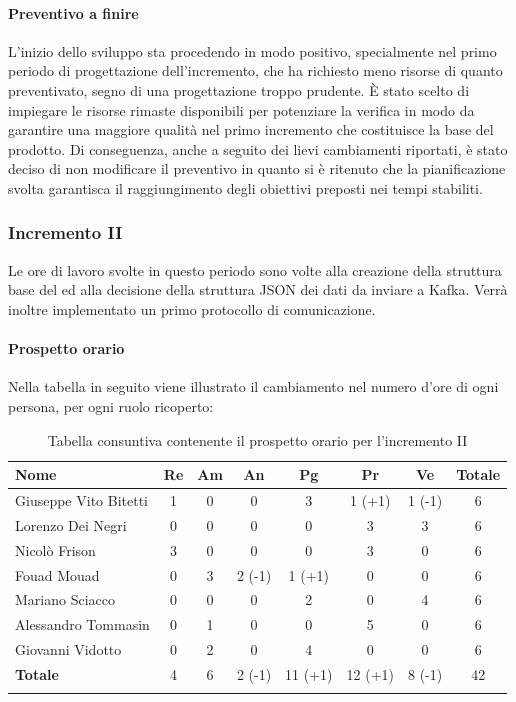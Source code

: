 		\paragraph{Preventivo a finire}
			L'inizio dello sviluppo sta procedendo in modo positivo, specialmente nel primo periodo di progettazione dell'incremento, che ha richiesto meno risorse di quanto preventivato, segno di una progettazione troppo prudente.
			\newline
			È stato scelto di impiegare le risorse rimaste disponibili per potenziare la verifica in modo da garantire una maggiore qualità nel primo incremento che costituisce la base del prodotto.
			\newline
			Di conseguenza, anche a seguito dei lievi cambiamenti riportati, è stato deciso di non modificare il preventivo in quanto si è ritenuto che la pianificazione svolta garantisca il raggiungimento degli obiettivi preposti nei tempi stabiliti.	

		\subsubsection{Incremento II }
		Le ore di lavoro svolte in questo periodo sono volte alla creazione della struttura base del  ed alla decisione della struttura JSON dei dati da inviare a Kafka. Verrà inoltre implementato un primo protocollo di comunicazione.
		\paragraph{Prospetto orario}
			Nella tabella in seguito viene illustrato il cambiamento nel numero d'ore di ogni persona, per ogni ruolo ricoperto:
			
			\begin{longtable}{|l|c|c|c|c|c|c|c|}
				\hline
				\rowcolor{lighter-grayer}
				\textbf{Nome} & \textbf{Re} & \textbf{Am} & \textbf{An} & \textbf{Pg}  & \textbf{Pr}   & \textbf{Ve} & \textbf{Totale} \\
				\hline
				\endfirsthead
				\hline
				Giuseppe Vito Bitetti  & 1 & 0 & 0 & 3 & 1 (+1) & 1 (-1) & 6\\
				\hline
				\hline
				Lorenzo Dei Negri      & 0 & 0 & 0 & 0 & 3 & 3 & 6 \\
				\hline
				\hline
				Nicolò Frison 			  & 3 & 0 & 0 & 0 & 3 & 0 & 6 \\
				\hline
				\hline
				Fouad Mouad 			& 0 & 3 & 2 (-1) & 1 (+1) & 0 & 0 & 6 \\
				\hline
				\hline
				Mariano Sciacco			 & 0 & 0 & 0 & 2 & 0 & 4 & 6 \\
				\hline
				\hline
				Alessandro Tommasin & 0 & 1 & 0 & 0 & 5 & 0 & 6 \\
				\hline
				\hline
				Giovanni Vidotto 		& 0 & 2 & 0 & 4 & 0 & 0 & 6\\
				\hline 
				\textbf{Totale} 		   & 4 &  6 & 2 (-1) & 11 (+1) & 12 (+1) & 8 (-1) & 42\\
				\hline 
				
				\caption{Tabella consuntiva contenente il prospetto orario per l'incremento II}
			\end{longtable}
			\pagebreak
			
